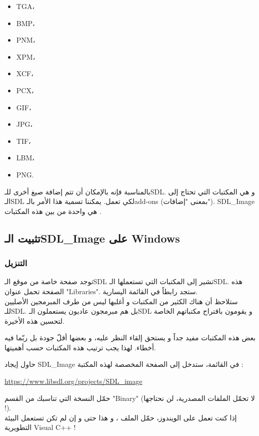 \begin{itemize}
	\item \textenglish{TGA}،
	\item \textenglish{BMP}،
	\item \textenglish{PNM}،
	\item \textenglish{XPM}،
	\item \textenglish{XCF}،
	\item \textenglish{PCX}،
	\item \textenglish{GIF}،
	\item \textenglish{JPG}،
	\item \textenglish{TIF}،
	\item \textenglish{LBM}،
	\item \textenglish{PNG}.
\end{itemize}

بالمناسبة فإنه بالإمكان أن تتم إضافة صيغ أخرى للـ\textenglish{SDL}.
و هي المكتبات التي تحتاج إلى الـ\textenglish{SDL}
لكي تعمل. يمكننا تسمية هذا الأمر بالـ\textenglish{add-ons}
(بمعنى "إضافات").
\textenglish{SDL\_Image}
هي واحدة من بين هذه المكتبات .

\subsection{تثبيت الـ\textenglish{SDL\_Image} على \textenglish{Windows}}

\subsubsection{التنزيل}

توجد صفحة خاصة من موقع الـ\textenglish{SDL}
تشير إلى المكتبات التي تستعملها الـ\textenglish{SDL}.
هذه الصفحة تحمل عنوان
"\textenglish{Libraries}".
ستجد رابطاً في القائمة اليسارية.\\
ستلاحظ أن هناك الكثير من المكتبات و أغلبها ليس من طرف المبرمجين الأصليين للـ\textenglish{SDL}.
بل هم مبرمجون عاديون يستعملون الـ\textenglish{SDL}
و يقومون باقتراح مكتباتهم الخاصة لتحسين هذه الأخيرة.

بعض هذه المكتبات مفيد جداً و يستحق إلقاء النظر عليه، و بعضها أقلّ جودة بل ربّما فيه أخطاء. لهذا يجب ترتيب هذه المكتبات حسب أهميتها.

حاول إيجاد
\textenglish{SDL\_Image}
في القائمة، ستدخل إلى الصفحة المخصصة لهذه المكتبة :

\url{https://www.libsdl.org/projects/SDL_image}

حمّل النسخة التي تناسبك من القسم
"\textenglish{Binary}"
(لا تحمّل الملفات المصدرية، لن نحتاجها !).\\
إذا كنت تعمل على الويندوز، حمّل الملف
،
و هذا حتى و إن لم تكن تستعمل البيئة التطويرية 
\textenglish{Visual C++} !

